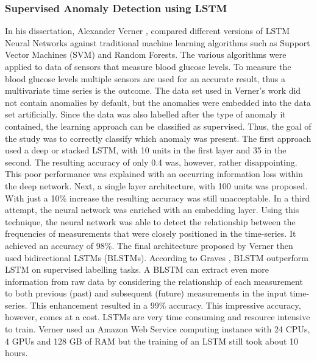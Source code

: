 \subsubsection{Supervised Anomaly Detection using LSTM} \label{Anomaly Detection using LSTM}
In his dissertation, Alexander Verner \parencite*{Verner2019}, compared different versions of LSTM Neural Networks against traditional machine learning algorithms such as Support Vector Machines (SVM) and Random Forests. The various algorithms were applied to data of sensors that measure blood glucose levels. To measure the blood glucose levels multiple sensors are used for an accurate result, thus a multivariate time series is the outcome. The data set used in Verner's work did not contain anomalies by default, but the anomalies were embedded into the data set artificially. Since the data was also labelled after the type of anomaly it contained, the learning approach can be classified as supervised. Thus, the goal of the study was to correctly classify which anomaly was present. The first approach used a deep or stacked LSTM, with 10 units in the first layer and 35 in the second. The resulting accuracy of only 0.4 was, however, rather disappointing. This poor performance was explained with an occurring information loss within the deep network. Next, a single layer architecture, with 100 units was proposed. With just a 10\% increase the resulting accuracy was still unacceptable. In a third attempt, the neural network was enriched with an embedding layer. Using this technique, the neural network was able to detect the relationship between the frequencies of measurements that were closely positioned in the time-series. It achieved an accuracy of 98\%. The final architecture proposed by Verner \parencite*{Verner2019} then used bidirectional LSTMs (BLSTMs). According to Graves \parencite*{Graves2005}, BLSTM outperform LSTM on supervised labelling tasks. A BLSTM can extract even more information from raw data by considering the relationship of each measurement to both previous (past) and subsequent (future) measurements in the input time-series. This enhancement resulted in a 99\% accuracy. This impressive accuracy, however, comes at a cost. LSTMs are very time consuming and resource intensive to train. Verner \parencite*{Verner2019} used an Amazon Web Service computing instance with 24 CPUs, 4 GPUs and 128 GB of RAM but the training of an LSTM still took about 10 hours.  

